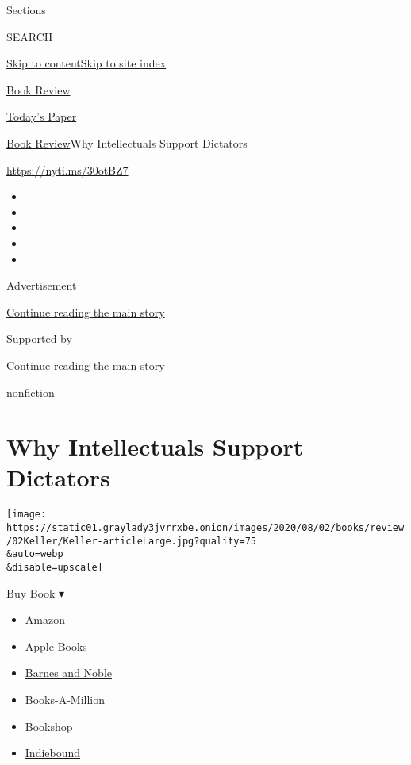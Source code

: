 Sections

SEARCH

\protect\hyperlink{site-content}{Skip to
content}\protect\hyperlink{site-index}{Skip to site index}

\href{https://www.nytimes3xbfgragh.onion/section/books/review}{Book
Review}

\href{https://myaccount.nytimes3xbfgragh.onion/auth/login?response_type=cookie\&client_id=vi}{}

\href{https://www.nytimes3xbfgragh.onion/section/todayspaper}{Today's
Paper}

\href{/section/books/review}{Book Review}\textbar{}Why Intellectuals
Support Dictators

\href{https://nyti.ms/30otBZ7}{https://nyti.ms/30otBZ7}

\begin{itemize}
\item
\item
\item
\item
\item
\end{itemize}

Advertisement

\protect\hyperlink{after-top}{Continue reading the main story}

Supported by

\protect\hyperlink{after-sponsor}{Continue reading the main story}

nonfiction

\hypertarget{why-intellectuals-support-dictators}{%
\section{Why Intellectuals Support
Dictators}\label{why-intellectuals-support-dictators}}

\texttt{[image: https://static01.graylady3jvrrxbe.onion/images/2020/08/02/books/review/02Keller/Keller-articleLarge.jpg?quality=75\\\&auto=webp\\\&disable=upscale]}

Buy Book ▾

\begin{itemize}
\tightlist
\item
  \href{https://www.amazon.com/gp/search?index=books\&tag=NYTBSREV-20\&field-keywords=Twilight+of+Democracy+Anne+Applebaum}{Amazon}
\item
  \href{https://du-gae-books-dot-nyt-du-prd.appspot.com/buy?title=Twilight+of+Democracy\&author=Anne+Applebaum}{Apple
  Books}
\item
  \href{https://www.anrdoezrs.net/click-7990613-11819508?url=https\%3A\%2F\%2Fwww.barnesandnoble.com\%2Fw\%2F\%3Fean\%3D9780385545808}{Barnes
  and Noble}
\item
  \href{https://www.anrdoezrs.net/click-7990613-35140?url=https\%3A\%2F\%2Fwww.booksamillion.com\%2Fp\%2FTwilight\%2Bof\%2BDemocracy\%2FAnne\%2BApplebaum\%2F9780385545808}{Books-A-Million}
\item
  \href{https://bookshop.org/a/3546/9780385545808}{Bookshop}
\item
  \href{https://www.indiebound.org/book/9780385545808?aff=NYT}{Indiebound}
\end{itemize}

